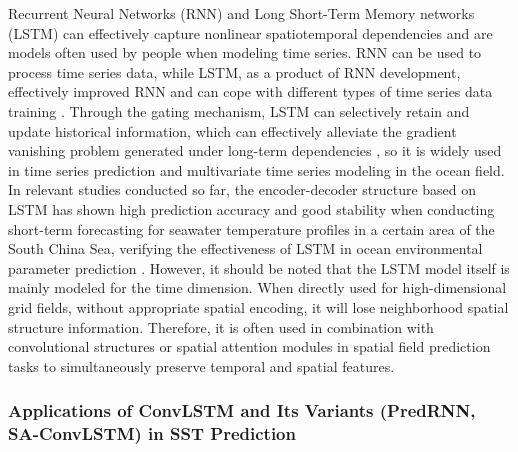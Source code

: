 \documentclass[webpdf,contemporary,large]{oup-authoring-template}
\begin{document}
Recurrent Neural Networks (RNN) and Long Short-Term Memory networks (LSTM) can effectively capture nonlinear spatiotemporal dependencies and are models often used by people when modeling time series. RNN can be used to process time series data, while LSTM, as a product of RNN development, effectively improved RNN and can cope with different types of time series data training \cite{SunMiaoShenDuXueXiZaiHaiYangDaShuJuWaJueZhongDeYingYong2018}. Through the gating mechanism, LSTM can selectively retain and update historical information, which can effectively alleviate the gradient vanishing problem generated under long-term dependencies \cite{YangJunGangJiYuYaoGanDeHaiYangSanWeiWenYanChangZhiNengTanCeYanJiuJinZhan2024}, so it is widely used in time series prediction and multivariate time series modeling in the ocean field. In relevant studies conducted so far, the encoder-decoder structure based on LSTM has shown high prediction accuracy and good stability when conducting short-term forecasting for seawater temperature profiles in a certain area of the South China Sea, verifying the effectiveness of LSTM in ocean environmental parameter prediction \cite{FanPeiQinJiYuLSTMWangLuoDeHaiShuiWenDuPouMianYuBaoYanJiu2024}. However, it should be noted that the LSTM model itself is mainly modeled for the time dimension. When directly used for high-dimensional grid fields, without appropriate spatial encoding, it will lose neighborhood spatial structure information. Therefore, it is often used in combination with convolutional structures or spatial attention modules in spatial field prediction tasks to simultaneously preserve temporal and spatial features.

\subsubsection{Applications of ConvLSTM and Its Variants (PredRNN, SA-ConvLSTM) in SST Prediction}
\end{document}
